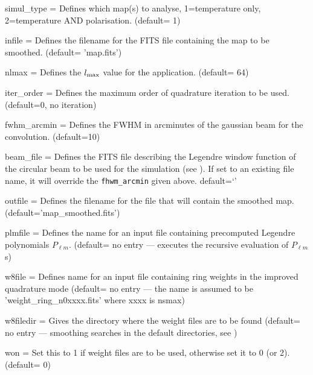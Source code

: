 \begin{qualifiers}
  \begin{qulist}{} %
     \item[{simul\_type = }]%
 Defines which map(s) to analyse, 1=temperature only, 2=temperature AND polarisation.
(default= 1)
    \item[{infile = }]%
 Defines the filename for the FITS file containing the map to be smoothed. 
	(default= 'map.fits')
    \item[{nlmax = }]%
 Defines the $l_{\mathrm{max}}$ value for the application.
(default= 64)
    \item[{iter\_order = }]%
 Defines the maximum order of quadrature 
      iteration to be used. (default=0, no iteration)
 \item[{fwhm\_arcmin = }]%
 Defines the FWHM in arcminutes of the gaussian 
beam for the convolution. (default=10)
    \item[{beam\_file = }] Defines the FITS file describing the
    Legendre window
    function of the circular beam to be used for the
    simulation (see ). 
    If set to an existing file name, it will override the
    {\tt fhwm\_arcmin} given above. default=`'
\item[{outfile = }]%
 Defines the filename for the file that will contain 
the smoothed map. (default='map\_smoothed.fits')
     \item[{plmfile = }] Defines the name for an input file
    containing  precomputed Legendre polynomials $P_{\ell m}$.
(default= no entry --- \thedocid executes the recursive evaluation 
of $P_{\ell m}$s)
\item[{w8file = }]%
 Defines name for an input file containing ring
  weights in the improved quadrature mode (default= no entry ---
the name is assumed to be 'weight\_ring\_n0xxxx.fits' where xxxx is nsmax)
\item[{w8filedir = }]%
 Gives the directory where the weight files are
to be found (default= no entry --- smoothing searches in the default
directories, see )
\item[{won = }]%
 Set this to 1 if weight files are to be used,
otherwise set it to 0 (or 2). (default= 0)
  \end{qulist}
\end{qualifiers}

